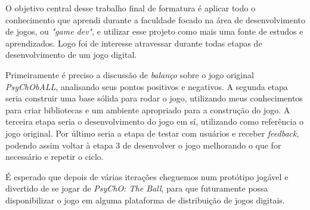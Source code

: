   O objetivo central desse trabalho final de formatura é aplicar todo o conhecimento que aprendi durante a faculdade focado na área de desenvolvimento de jogos, ou \textit{"game dev"}, e utilizar esse projeto como mais uma fonte de estudos e aprendizados. Logo foi de interesse atravessar durante todas etapas de desenvolvimento de um jogo digital.

  Primeiramente é preciso a discussão de \textit{balanço} sobre o jogo original \textit{PsyChObALL}, analisando seus pontos positivos e negativos. A segunda etapa seria construir uma base sólida para rodar o jogo, utilizando meus conhecimentos para criar bibliotecas e um ambiente apropriado para a construção do jogo. A terceira etapa seria o desenvolvimento do jogo em sí, utilizando como referência o jogo original. Por último seria a etapa de testar com usuários e receber \textit{feedback}, podendo assim voltar à etapa 3 de desenvolver o jogo melhorando o que for necessário e repetir o ciclo.

  É esperado que depois de várias iterações cheguemos num protótipo jogável e divertido de se jogar de \textit{PsyChO: The Ball}, para que futuramente possa disponibilizar o jogo em alguma plataforma de distribuição de jogos digitais.
